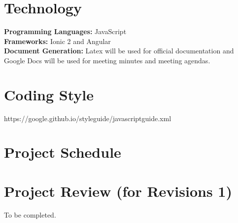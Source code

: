 \documentclass[12pt,fleqn]{article}
\begin{document}
\section {Technology}
\textbf{Programming Languages: }JavaScript \\

\textbf{Frameworks: }Ionic 2 and Angular \\

\textbf{Document Generation: } Latex will be used for official documentation and Google Docs will be used for meeting minutes and meeting agendas. 

\section {Coding Style}
 https://google.github.io/styleguide/javascriptguide.xml

\section {Project Schedule}


\section {Project Review (for Revisions 1)}
To be completed.
\end{document}
